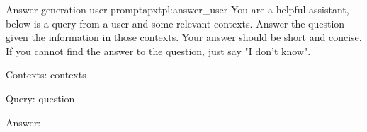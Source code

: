 \begin{apxtemplate}{Answer-generation user prompt}{apxtpl:answer_user}
You are a helpful assistant, below is a query from a user and some relevant contexts. Answer the question given the information in those contexts. Your answer should be short and concise. If you cannot find the answer to the question, just say "I don't know". 

Contexts: {contexts} 

Query: {question} 

Answer:
\end{apxtemplate}
